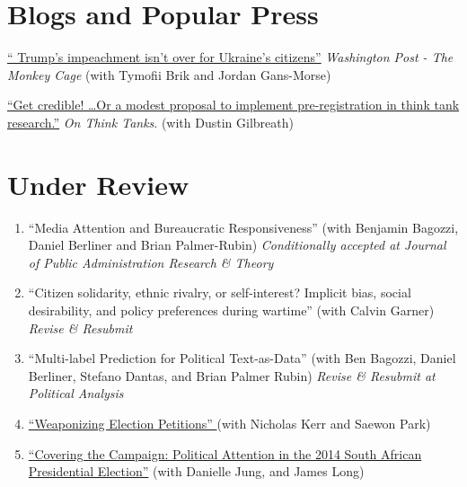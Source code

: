 \documentclass[margin,line]{res}
\begin{document}
{\begin{resume}
\section{\sc Blogs and Popular Press}
\renewcommand{\labelenumi}{M\theenumi.}

\begin{etaremune}

\item \href{https://www.washingtonpost.com/politics/2020/02/19/trumps-impeachment-isnt-over-ukraines-citizens/}{``
  Trump’s impeachment isn’t over for Ukraine’s citizens''}
\emph{Washington Post - The Monkey Cage} (with Tymofii Brik and Jordan
Gans-Morse)

\item \href{https://onthinktanks.org/articles/get-credible-or-a-modest-proposal-to-implement-pre-registration-in-think-tank-research/}{``Get
credible! …Or a modest proposal to implement pre-registration in think
tank research.''} \emph{On Think Tanks}. (with Dustin Gilbreath)
\end{etaremune}

\section{\sc Under Review}
\renewcommand{\labelenumi}{UR\theenumi.}

\begin{enumerate}

\item ``Media Attention and Bureaucratic Responsiveness'' (with Benjamin
  Bagozzi, Daniel Berliner and Brian Palmer-Rubin)
  \textit{Conditionally accepted at Journal of Public Administration
    Research \& Theory}

  \item ``Citizen solidarity, ethnic rivalry, or self-interest? Implicit bias,
social desirability, and policy preferences during wartime'' (with
Calvin Garner) \textit{Revise \& Resubmit}

\item  ``Multi-label Prediction for Political Text-as-Data'' (with Ben Bagozzi, Daniel Berliner,
  Stefano Dantas, and Brian Palmer Rubin) \textit{Revise \& Resubmit
    at Political Analysis }

\item \href {10.31219/osf.io/tsmvz}{``Weaponizing Election Petitions'' }(with
  Nicholas Kerr and Saewon Park)

 \item\href{https://osf.io/preprints/socarxiv/af9jq/}{``Covering the Campaign: Political Attention in the 2014 South African
Presidential Election''} (with Danielle Jung, and James Long)


\end{enumerate}
\end{resume}}
\end{document}
